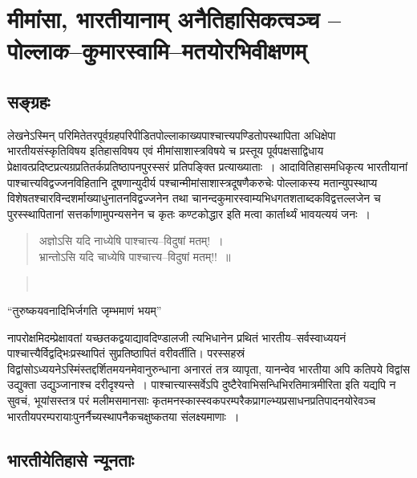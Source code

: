 
\chapter{मीमांसा, भारतीयानाम् अनैतिहासिकत्वञ्च – पोल्लाक–कुमारस्वामि–मतयोरभिवीक्षणम्}



\section*{सङ्ग्रहः}

लेखनेऽस्मिन् परिमितेतरपूर्वग्रहपरिपीडितपोल्लाकाख्यपाश्चात्त्यपण्डितोपस्थापिता अधिक्षेपा भारतीयसंस्कृतिविषय इतिहासविषय एवं मीमांसाशास्त्रविषये च प्रस्तूय पूर्वपक्षसाद्विधाय प्रेक्षावत्प्रदिष्टप्रत्यग्रप्रतितर्कप्रतिष्ठापनपुरस्सरं प्रतिपङ्क्ति प्रत्याख्याताः~। आदावितिहासमधिकृत्य भारतीयानां पाश्चात्त्यविद्वज्जनविहितानि दूषणान्युदीर्य पश्चान्मीमांसाशास्त्रदूषणैकरुचेः पोल्लाकस्य मतान्युपस्थाप्य विशेषतश्चारविन्दशर्माख्याधुनातनविद्वज्जनेन तथा चानन्दकुमारस्वाम्यभिधगतशताब्दकविद्वत्तल्लजेन च पुरस्स्थापितानां सत्तर्काणामुपन्यसनेन च कृतः कण्टकोद्धार इति मत्वा कार्तार्थ्यं भावयत्ययं जनः~।

\begin{verse}
अज्ञोऽसि यदि नाध्येषि पाश्चात्त्य–विदुषां मतम्!~।\\ भ्रान्तोऽसि यदि चाध्येषि पाश्चात्त्य–विदुषां मतम्!!~॥
\end{verse}

\begin{verse}
\\
\end{verse}

“तुरुष्कयवनादिभिर्जगति जृम्भमाणं भयम्”

नापरोक्षमिदम्प्रेक्षावतां यच्छतकद्वयाद्यावदिण्डालजी त्यभिधानेन प्रथितं भारतीय–सर्वस्वाध्ययनं पाश्चात्त्यैर्विद्वद्भिःप्रस्थापितं सुप्रतिष्ठापितं वरीवर्तीति। परस्सहस्रं विद्वांसोऽध्ययनेऽस्मिंस्तद्दर्शितमयनमेवानुरुन्धाना अनारतं तत्र व्यापृता, यानन्वेव भारतीया अपि कतिपये विद्वांस उद्युक्ता उद्युञ्जानाश्च दरीदृश्यन्ते~। पाश्चात्त्यास्सर्वेऽपि दुष्टैरेवाभिसन्धिभिरतिमात्रमीरिता इति यद्यपि न सुवचं, भूयांसस्तत्र परं मलीमसमानसाः कृतमनस्कास्स्वकपरम्परैकप्रागल्भ्यप्रसाधनप्रतिपादनयोरेवञ्च भारतीयपरम्परायाःपुनर्नैच्यस्थापनैकचक्षुष्कतया संलक्ष्यमाणाः~।


\section*{भारतीयेतिहासे न्यूनताः}

